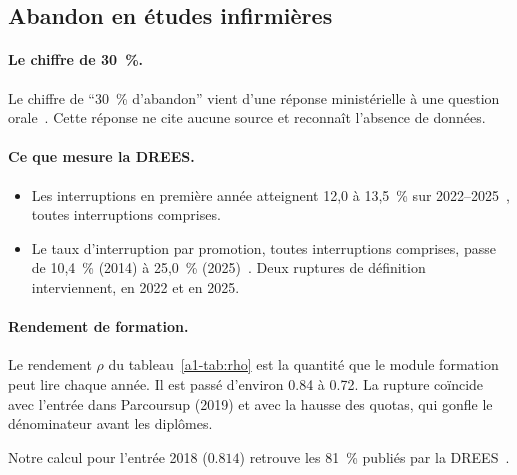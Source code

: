 \subsection{Abandon en études infirmières}

\paragraph{Le chiffre de 30~\%.}
Le chiffre de \enquote{30~\% d'abandon} vient d'une réponse ministérielle à
une question orale~\cite{a1-qo101}. Cette réponse ne cite aucune source et
reconnaît l'absence de données.

\paragraph{Ce que mesure la DREES.}
\begin{itemize}
\item Les interruptions en première année atteignent 12,0 à 13,5~\% sur
  2022--2025~\cite{a1-drees491}, toutes interruptions comprises.
\item Le taux d'interruption par promotion, toutes interruptions comprises,
  passe de 10,4~\% (2014) à 25,0~\% (2025)~\cite{a1-drees491}. Deux ruptures de
  définition interviennent, en 2022 et en 2025.
\end{itemize}

\paragraph{Rendement de formation.}
Le rendement $\rho$ du tableau~\ref{a1-tab:rho} est la quantité que le module
formation peut lire chaque année. Il est passé d'environ \num{0.84} à
\num{0.72}. La rupture coïncide avec l'entrée dans Parcoursup (2019) et
avec la hausse des quotas, qui gonfle le dénominateur avant les diplômes.

Notre calcul pour l'entrée 2018 ($\num{0.814}$\mesure) retrouve les 81~\%
publiés par la DREES~\cite{a1-er1266}.

